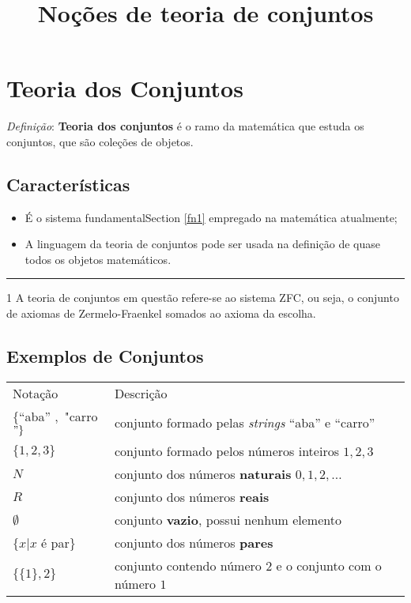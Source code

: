     \title{Noções de teoria de conjuntos}
    
    
    \maketitle
    
\section{Teoria dos Conjuntos}\label{teoria-dos-conjuntos}

\emph{Definição}: \textbf{Teoria dos conjuntos} é o ramo da matemática
que estuda os conjuntos, que são coleções de objetos.

\hypertarget{caracteruxedsticas}{%
\subsection{Características}\label{caracteruxedsticas}}

\begin{itemize}
\item
  É o sistema fundamentalSection \ref{fn1} empregado na matemática
  atualmente;
\item
  A linguagem da teoria de conjuntos pode ser usada na definição de
  quase todos os objetos matemáticos.
\end{itemize}

\begin{center}\rule{0.5\linewidth}{0.5pt}\end{center}

1\protect\hypertarget{fn1}{}{ A teoria de conjuntos em questão refere-se
ao sistema ZFC, ou seja, o conjunto de axiomas de Zermelo-Fraenkel
somados ao axioma da escolha.}

    \hypertarget{exemplos-de-conjuntos}{%
\subsection{Exemplos de Conjuntos}\label{exemplos-de-conjuntos}}

\begin{longtable}[]{@{}ll@{}}
Notação & Descrição\tabularnewline
\(\{\)``aba'' \(,\) "carro\("\}\) & conjunto formado pelas
\emph{strings} ``aba'' e ``carro''\tabularnewline
\(\{1,2,3\}\) & conjunto formado pelos números inteiros
\(1, 2, 3\)\tabularnewline
\(N\) & conjunto dos números \textbf{naturais}
\(0,1,2,\dots\)\tabularnewline
\(R\) & conjunto dos números \textbf{reais}\tabularnewline
\(\emptyset\) & conjunto \textbf{vazio}, possui nenhum
elemento\tabularnewline
\(\{x|x\) é par\(\}\) & conjunto dos números
\textbf{pares}\tabularnewline
\(\{\{1\},2\}\) & conjunto contendo número \(2\) e o conjunto com o
número \(1\)\tabularnewline
\end{longtable}

